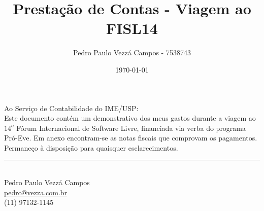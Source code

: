 \documentclass{article}
\begin{document}
\title{Prestação de Contas - Viagem ao FISL14}
\author{Pedro Paulo Vezzá Campos - 7538743}
\date{\today}

\maketitle


\hfill Ao Serviço de Contabilidade do IME/USP:\\

Este documento contém um demonstrativo dos meus gastos durante a viagem ao $14^o$ Fórum Internacional de Software Livre, financiada via verba do programa Pró-Eve. Em anexo encontram-se as notas fiscais que comprovam os pagamentos. Permaneço à disposição para quaisquer esclarecimentos.

\vfill

\begin{flushright}
\noindent\rule{8cm}{0.4pt} \\
Pedro Paulo Vezzá Campos\\
\url{pedro@vezza.com.br}\\
(11) 97132-1145\\
\end{flushright}
\end{document}
